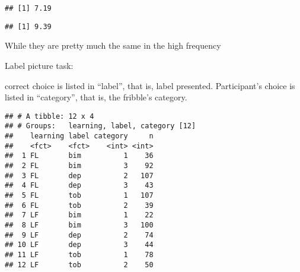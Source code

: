 \documentclass[
]{article}
\newenvironment{Shaded}{\begin{snugshade}}{\end{snugshade}}
\newcommand{\DecValTok}[1]{\textcolor[rgb]{0.00,0.00,0.81}{#1}}
\newcommand{\KeywordTok}[1]{\textcolor[rgb]{0.13,0.29,0.53}{\textbf{#1}}}
\newcommand{\NormalTok}[1]{#1}
\newcommand{\OperatorTok}[1]{\textcolor[rgb]{0.81,0.36,0.00}{\textbf{#1}}}
\newcommand{\StringTok}[1]{\textcolor[rgb]{0.31,0.60,0.02}{#1}}
\begin{document}
\begin{verbatim}
## [1] 7.19
\end{verbatim}

\begin{Shaded}
\end{Shaded}

\begin{verbatim}
## [1] 9.39
\end{verbatim}

While they are pretty much the same in the high frequency

Label picture task:

correct choice is listed in ``label'', that is, label presented.
Participant's choice is listed in ``category'', that is, the fribble's
category.

\begin{Shaded}
\end{Shaded}

\begin{verbatim}
## # A tibble: 12 x 4
## # Groups:   learning, label, category [12]
##    learning label category     n
##    <fct>    <fct>    <int> <int>
##  1 FL       bim          1    36
##  2 FL       bim          3    92
##  3 FL       dep          2   107
##  4 FL       dep          3    43
##  5 FL       tob          1   107
##  6 FL       tob          2    39
##  7 LF       bim          1    22
##  8 LF       bim          3   100
##  9 LF       dep          2    74
## 10 LF       dep          3    44
## 11 LF       tob          1    78
## 12 LF       tob          2    50
\end{verbatim}
\end{document}
